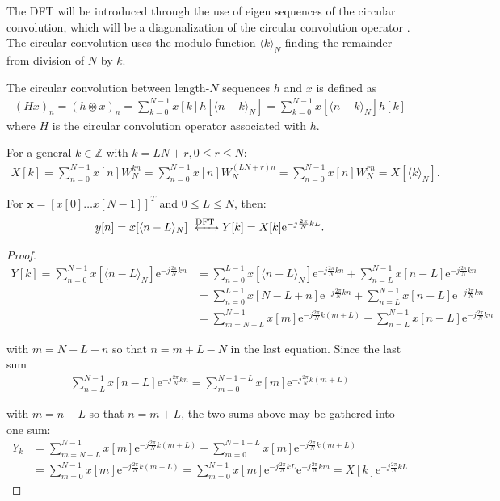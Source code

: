 The DFT will be introduced through the use of eigen sequences of the circular convolution, which will be a diagonalization of the circular convolution operator \cite{FSP}. The circular convolution uses the modulo function $\langle k\rangle_N$ finding the remainder from division of $N$ by $k$.

\begin{definition}
 	The circular convolution between length-$N$ sequences $h$ and $x$ is defined as
\begin{align*}
	(Hx)_n = (h \circledast x)_n = \sum_{k = 0}^{N-1} x[k] h[\langle n-k\rangle_N] =\sum_{k = 0}^{N-1} x[\langle n-k\rangle_N] h[k]
\end{align*}
where $H$ is the circular convolution operator associated with $h$.
\end{definition}

For a general $k\in\mathbb{Z}$ with $k = LN + r, 0 \leq r \leq N$:
\begin{align*}
X[k] = \sum_{n=0}^{N-1} x[n] W_N^{kn} = \sum_{n=0}^{N-1} x[n] W_N^{(LN+r)n} = \sum_{n=0}^{N-1} x[n] W_N^{rn} = X[\langle k\rangle_N].
\end{align*}

\begin{lemma}
For $\textbf{x} = [x[0] \dots x[N-1]]^T$ and $0 \leq L \leq N$, then:
\begin{align*}
y[n]  = x[\langle n-L\rangle_N] \xleftrightarrow{\text{DFT}} Y[k] = X[k] \text{e}^{-j\frac{2\pi}{N} kL}.
\end{align*}
\end{lemma}

\begin{proof}
\begin{align*}
Y[k] = \sum_{n=0}^{N-1} x[\langle n-L\rangle_N] \text{e}^{-j\frac{2\pi}{N} kn} &= \sum_{n=0}^{L-1} x[\langle n-L\rangle_N]\text{e}^{-j\frac{2\pi}{N} kn} + \sum_{n=L}^{N-1} x[n-L]\text{e}^{-j\frac{2\pi}{N} kn} \\
&= \sum_{n=0}^{L-1} x[N-L+n]\text{e}^{-j\frac{2\pi}{N} kn} + \sum_{n=L}^{N-1} x[n-L]\text{e}^{-j\frac{2\pi}{N} kn} \\
&= \sum_{m=N-L}^{N-1} x[m]\text{e}^{-j\frac{2\pi}{N} k(m+L)} + \sum_{n=L}^{N-1} x[n-L]\text{e}^{-j\frac{2\pi}{N} kn}
\end{align*}

with $m = N - L + n$ so that $n = m + L - N$ in the last equation. Since the last sum
\begin{align*}
\sum_{n=L}^{N-1} x[n-L]\text{e}^{-j\frac{2\pi}{N} kn} = \sum_{m=0}^{N-1-L} x[m] \text{e}^{-j\frac{2\pi}{N}k(m+L)}
\end{align*}

with $m = n - L$ so that $n = m + L$, the two sums above may be gathered into one sum:
\begin{align*}
Y_k &= \sum_{m=N-L}^{N-1} x[m]\text{e}^{-j\frac{2\pi}{N} k(m+L)} + \sum_{m=0}^{N-1-L} x[m] \text{e}^{-j\frac{2\pi}{N}k(m+L)}  \\
&= \sum_{m=0}^{N-1} x[m] \text{e}^{-j\frac{2\pi}{N}k(m+L)} = \sum_{m=0}^{N-1} x[m] \text{e}^{-j\frac{2\pi}{N}kL}\text{e}^{-j\frac{2\pi}{N}km} = X[k] \text{e}^{-j\frac{2\pi}{N}kL}
\end{align*}
\end{proof}

